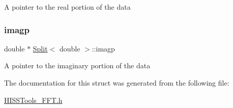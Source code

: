 A pointer to the real portion of the data \mbox{\label{_h_i_s_s_tools___f_f_t_8h_a21ff23a96abee0c0ed6a2433798c4eac}} 
\subsubsection{\texorpdfstring{imagp}{imagp}}
{\footnotesize\ttfamily double $\ast$ \hyperlink{_h_i_s_s_tools___f_f_t_8h_struct_split}{Split}$<$ double  $>$\+::imagp\hspace{0.3cm}{\ttfamily [inherited]}}

A pointer to the imaginary portion of the data 

The documentation for this struct was generated from the following file\+:\begin{DoxyCompactItemize}
\item 
\hyperlink{_h_i_s_s_tools___f_f_t_8h}{H\+I\+S\+S\+Tools\+\_\+\+F\+F\+T.\+h}\end{DoxyCompactItemize}

